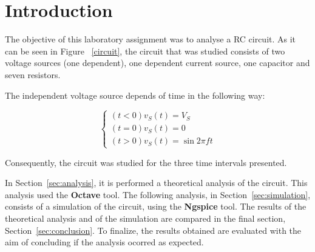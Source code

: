 \section{Introduction}
\label{sec:introduction}

The objective of this laboratory assignment was to analyse a RC circuit. As it can be seen in Figure ~\ref{circuit}, the circuit that was studied consists of two voltage sources (one dependent), one dependent current source, one capacitor and seven resistors.

The independent voltage source depends of time in the following way:

\begin{equation}
  \begin{cases}
    (t < 0) v_S(t) = V_S \\
    (t = 0) v_S(t) = 0 \\
    (t > 0) v_S(t) = \sin{2\pi ft}
  \end{cases}
\end{equation}

Consequently, the circuit was studied for the three time intervals presented.

In Section~\ref{sec:analysis}, it is performed a theoretical analysis of the circuit. This analysis used the {\bf Octave} tool. The following analysis, in Section~\ref{sec:simulation}, consists of a simulation of the circuit, using the {\bf Ngspice} tool. The results of the theoretical analysis and of the simulation are compared in the final section, Section~\ref{sec:conclusion}. To finalize, the results obtained are evaluated with the aim of concluding if the analysis ocorred as expected.





